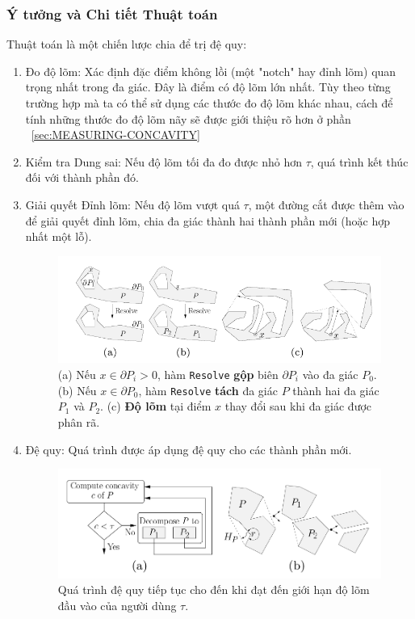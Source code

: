 \documentclass{article}
\begin{document}
\subsubsection{Ý tưởng và Chi tiết Thuật toán}



Thuật toán là một chiến lược chia để trị đệ quy\cite{lien2006}:
\begin{enumerate}
\item Đo độ lõm: Xác định đặc điểm không lồi (một "notch" hay đỉnh lõm) quan trọng nhất trong đa giác. Đây là điểm có độ lõm lớn nhất. Tùy theo từng trường hợp mà ta có thể sử dụng các thước đo độ lõm khác nhau, cách để tính những thước đo độ lõm nãy sẽ được giới thiệu rõ hơn ở phần ~\ref{sec:MEASURING-CONCAVITY}


\item Kiểm tra Dung sai: Nếu độ lõm tối đa đo được nhỏ hơn $\tau$, quá trình kết thúc đối với thành phần đó.

\item Giải quyết Đỉnh lõm: Nếu độ lõm vượt quá $\tau$, một đường cắt được thêm vào để giải quyết đỉnh lõm, chia đa giác thành hai thành phần mới (hoặc hợp nhất một lỗ).

\begin{figure}[H]
    \centering
    \includegraphics[width=1\linewidth]{imgs/ACD-3.png}
    \caption{%
        (a) Nếu $x \in \partial P_i > 0$, hàm \texttt{Resolve} \textbf{gộp} biên $\partial P_i$ vào đa giác $P_0$.
        (b) Nếu $x \in \partial P_0$, hàm \texttt{Resolve} \textbf{tách} đa giác $P$ thành hai đa giác $P_1$ và $P_2$.
        (c) \textbf{Độ lõm} tại điểm $x$ thay đổi sau khi đa giác được phân rã.%
    }
\end{figure}

\item Đệ quy: Quá trình được áp dụng đệ quy cho các thành phần mới.

\begin{figure}[H]
    \centering
    \includegraphics[width=0.5\linewidth]{imgs/ACD-1.png}
    \caption{Quá trình đệ quy tiếp tục cho đến khi đạt đến giới hạn độ lõm đầu vào của người dùng $\tau$.}
\end{figure}

\end{enumerate}
\end{document}
